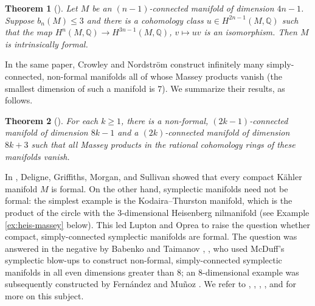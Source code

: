 \documentclass{article}
\numberwithin{equation}{section}
\newtheorem{theorem}{Theorem}[section]
\theoremstyle{definition}
\newcommand{\Q}{\mathbb{Q}}
\begin{document}
\begin{theorem}[\cite{CN}]
\label{thm:intrinsic-cn}
Let $M$ be an $(n-1)$-connected manifold of dimension $4n-1$. 
Suppose $b_n(M)\le 3$ and there is a cohomology class $u\in H^{2n-1}(M,\Q)$ 
such that the map $H^n(M,\Q)\to H^{3n-1}(M,\Q)$, $v\mapsto u v$ 
is an isomorphism. Then $M$ is intrinsically formal.
\end{theorem}

In the same paper, Crowley and Nordstr\"{o}m construct infinitely many 
simply-con\-nected, non-formal manifolds all of whose Massey products 
vanish (the smallest dimension of such a manifold is $7$). We summarize 
their results, as follows.

\begin{theorem}[\cite{CN}]
\label{thm:nf-Massey-vanish}
For each $k\ge 1$, there is a non-formal, $(2k-1)$-connected 
manifold of dimension $8k-1$ and a $(2k)$-connected manifold 
of dimension $8k+3$ such that all Massey products in the rational 
cohomology rings of these manifolds vanish. 
\end{theorem}

In \cite{DGMS}, Deligne, Griffiths, Morgan, and Sullivan showed that 
every compact K\"{a}hler manifold $M$ is formal. On the other hand, 
symplectic manifolds need not be formal: the simplest example is 
the Kodaira--Thurston manifold, which is the product of the circle with 
the $3$-dimensional Heisenberg nilmanifold (see 
Example \ref{ex:heis-massey} below). This led Lupton 
and Oprea  \cite{Lupton-Oprea} to raise the question
whether compact, simply-connected symplectic manifolds 
are formal. The question was answered in the negative by 
Babenko and Taimanov \cite{BT}, \cite{BT-2}, who used McDuff's symplectic 
blow-ups to construct non-formal, simply-connected symplectic 
manifolds in all even dimensions greater than $8$; an $8$-dimensional 
example was subsequently constructed by Fern\'andez and Mu\~noz \cite{FM08}. 
We refer to \cite{FGM}, \cite{TO}, \cite{RT}, \cite{LS-gt}, and \cite{FOT} for 
more on this subject. 
\end{document}
